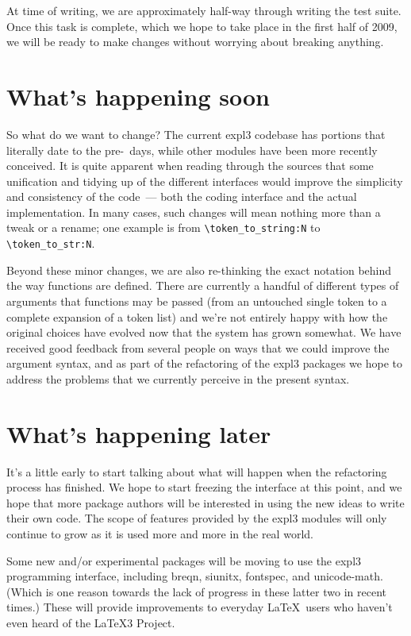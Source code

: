 \documentclass{ltnews}
\begin{document}
At time of writing, we are approximately half-way through writing the test suite. Once this task is complete, which we hope to take place in the first half of 2009, we will be ready to make changes without worrying about breaking anything. 

\section{What's happening soon}

So what do we want to change? The current \textsf{expl3} codebase has portions that literally date to the pre-\LaTeXe\ days, while other modules have been more recently conceived. It is quite apparent when reading through the sources that some unification and tidying up of the different interfaces would improve the simplicity and consistency of the code~--- both the coding interface and the actual implementation. In many cases, such changes will mean nothing more than a tweak or a rename; one example is from \verb=\token_to_string:N= to \verb=\token_to_str:N=.

Beyond these minor changes, we are also re-thinking the exact notation behind the way functions are defined. There are currently a handful of different types of arguments that functions may be passed (from an untouched single token to a complete expansion of a token list) and we're not entirely happy with how the original choices have evolved now that the system has grown somewhat. We have received good feedback from several people on ways that we could improve the argument syntax, and as part of the refactoring of the \textsf{expl3} packages we hope to address the problems that we currently perceive in the present syntax.

\section{What's happening later}

It's a little early to start talking about what will happen when the refactoring process has finished. We hope to start freezing the interface at this point, and we hope that more package authors will be interested in using the new ideas to write their own code. The scope of features provided by the \textsf{expl3} modules will only continue to grow as it is used more and more in the real world.

Some new and/or experimental packages will be moving to use the \textsf{expl3} programming interface, including \textsf{breqn}, \textsf{siunitx}, \textsf{fontspec}, and \textsf{unicode-math}. (Which is one reason towards the lack of progress in these latter two in recent times.) These will provide improvements to everyday \LaTeX\ users who haven't even heard of the \LaTeX3 Project.
\end{document}
